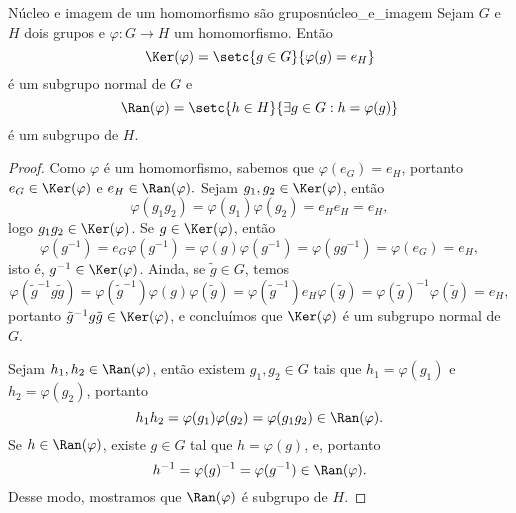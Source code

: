 \begin{proposition}{Núcleo e imagem de um homomorfismo são grupos}{núcleo_e_imagem}
    Sejam \(G\) e \(H\) dois grupos e \(\varphi : G \to H\) um homomorfismo. Então
    \begin{equation*}
        \Ker(\varphi) = \setc{g \in G}{\varphi(g) = e_H}
    \end{equation*}
    é um subgrupo normal de \(G\) e
    \begin{equation*}
        \Ran(\varphi) = \setc{h \in H}{\exists g \in G : h = \varphi(g)}
    \end{equation*}
    é um subgrupo de \(H\).
\end{proposition}
\begin{proof}
    Como \(\varphi\) é um homomorfismo, sabemos que \(\varphi(e_G) = e_H\), portanto \(e_G \in \Ker(\varphi)\) e \(e_H \in \Ran(\varphi).\) Sejam \(g_1, g_2 \in \Ker(\varphi)\), então
    \begin{equation*}
        \varphi(g_1g_2) = \varphi(g_1)\varphi(g_2) = e_H e_H = e_H,
    \end{equation*}
    logo \(g_1g_2 \in \Ker(\varphi)\). Se \(g \in \Ker(\varphi)\), então
    \begin{equation*}
        \varphi(g^{-1}) = e_G \varphi(g^{-1}) = \varphi(g) \varphi(g^{-1}) = \varphi(g g^{-1}) = \varphi(e_G) = e_H,
    \end{equation*}
    isto é, \(g^{-1} \in \Ker(\varphi)\). Ainda, se \(\tilde{g} \in G\), temos
    \begin{equation*}
        \varphi(\tilde{g}^{-1} g \tilde{g}) = \varphi(\tilde{g}^{-1}) \varphi(g) \varphi(\tilde{g}) = \varphi(\tilde{g}^{-1}) e_H \varphi(\tilde{g}) = \varphi(\tilde{g})^{-1} \varphi(\tilde{g}) = e_H,
    \end{equation*}
    portanto \(\tilde{g}^{-1} g \tilde{g} \in \Ker(\varphi)\), e concluímos que \(\Ker(\varphi)\) é um subgrupo normal de \(G\).

    Sejam \(h_1, h_2 \in \Ran(\varphi)\), então existem \(g_1, g_2 \in G\) tais que \(h_1 = \varphi(g_1)\) e \(h_2 = \varphi(g_2)\), portanto
    \begin{equation*}
        h_1 h_2 = \varphi(g_1)\varphi(g_2) = \varphi(g_1g_2) \in \Ran(\varphi).
    \end{equation*}
    Se \(h \in \Ran(\varphi)\), existe \(g \in G\) tal que \(h = \varphi(g)\), e, portanto
    \begin{equation*}
        h^{-1} = \varphi(g)^{-1} = \varphi(g^{-1}) \in \Ran(\varphi).
    \end{equation*}
    Desse modo, mostramos que \(\Ran(\varphi)\) é subgrupo de \(H\).
\end{proof}
